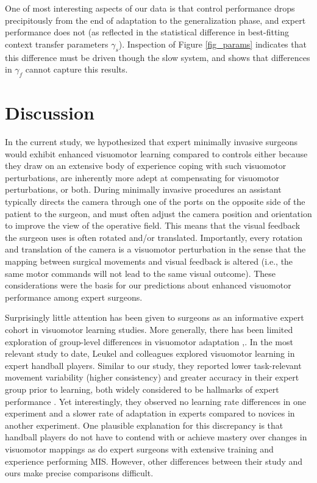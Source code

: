 \documentclass[jou, 11pt, longtable, floatsintext, notab]{apa6}
\begin{document}
One of most interesting aspects of our data is that control
performance drops precipitously from the end of adaptation
to the generalization phase, and expert performance does not
(as reflected in the statistical difference in best-fitting
context transfer parameters $\gamma_s$). Inspection of
Figure \ref{fig_params} indicates that this difference must
be driven though the slow system, and shows that differences
in $\gamma_f$ cannot capture this results.

\section{Discussion}
In the current study, we hypothesized that expert minimally
invasive surgeons would exhibit enhanced visuomotor learning
compared to controls either because they draw on an
extensive body of experience coping with such visuomotor
perturbations, are inherently more adept at compensating for
visuomotor perturbations, or both. During minimally invasive
procedures an assistant typically directs the camera through
one of the ports on the opposite side of the patient to the
surgeon, and must often adjust the camera position and
orientation to improve the view of the operative field. This
means that the visual feedback the surgeon uses is often
rotated and/or translated. Importantly, every rotation and
translation of the camera is a visuomotor perturbation in
the sense that the mapping between surgical movements and
visual feedback is altered (i.e., the same motor commands
will not lead to the same visual outcome). These
considerations were the basis for our predictions about
enhanced visuomotor performance among expert surgeons.

Surprisingly little attention has been given to surgeons as
an informative expert cohort in visuomotor learning studies.
More generally, there has been limited exploration of
group-level differences in visuomotor adaptation
\cite{leukel_experts_2015},\cite{kast_motor_2016}. In the
most relevant study to date, Leukel and colleagues
\cite{leukel_experts_2015} explored visuomotor learning in
expert handball players. Similar to our study, they reported
lower task-relevant movement variability (higher
consistency) and greater accuracy in their expert group
prior to learning, both widely considered to be hallmarks of
expert performance
\cite{willingham_neuropsychological_1998}. Yet
interestingly, they observed no learning rate differences in
one experiment and a slower rate of adaptation in experts
compared to novices in another experiment. One plausible
explanation for this discrepancy is that handball players do
not have to contend with or achieve mastery over changes in
visuomotor mappings as do expert surgeons with extensive
training and experience performing MIS. However, other
differences between their study and ours make precise
comparisons difficult.
\end{document}
